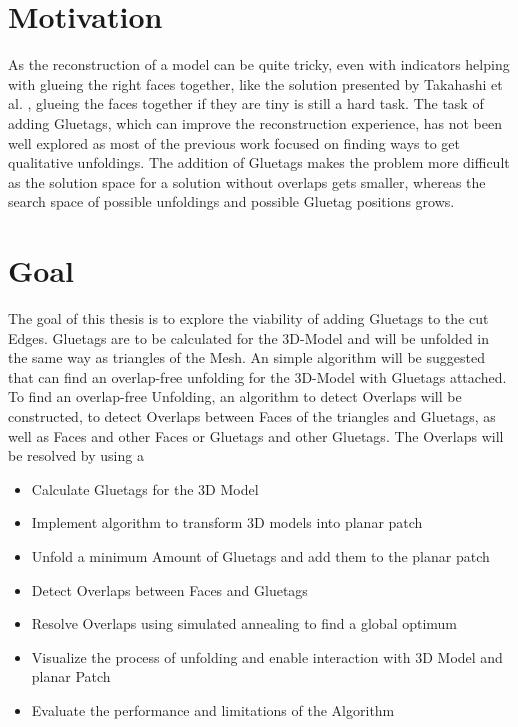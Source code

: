 \documentclass[draft,final]{vutinfth} %
\begin{document}
\section{Motivation}

As the reconstruction of a model can be quite tricky, even with indicators helping with glueing the right faces together, like the solution presented by Takahashi et al. \cite{takahashi2011optimized}, glueing the faces together if they are tiny is still a hard task.
The task of adding Gluetags, which can improve the reconstruction experience, has not been well explored as most of the previous work focused on finding ways to get qualitative unfoldings. The addition of Gluetags makes the problem more difficult as the solution space for a solution without overlaps gets smaller, whereas the search space of possible unfoldings and possible Gluetag positions grows.

\section{Goal}

The goal of this thesis is to explore the viability of adding Gluetags to the cut Edges. Gluetags are to be calculated for the 3D-Model and will be unfolded in the same way as triangles of the Mesh. An simple algorithm will be suggested that can find an overlap-free unfolding for the 3D-Model with Gluetags attached. To find an overlap-free Unfolding, an algorithm to detect Overlaps will be constructed, to detect Overlaps between Faces of the triangles and Gluetags, as well as Faces and other Faces or Gluetags and other Gluetags.
The Overlaps will be resolved by using a 

\begin{itemize}
	\item Calculate Gluetags for the 3D Model
	\item Implement algorithm to transform 3D models into planar patch
	\item Unfold a minimum Amount of Gluetags and add them to the planar patch
	\item Detect Overlaps between Faces and Gluetags
	\item Resolve Overlaps using simulated annealing to find a global optimum
	\item Visualize the process of unfolding and enable interaction with 3D Model and planar Patch
	\item Evaluate the performance and limitations of the Algorithm
\end{itemize}
\end{document}
